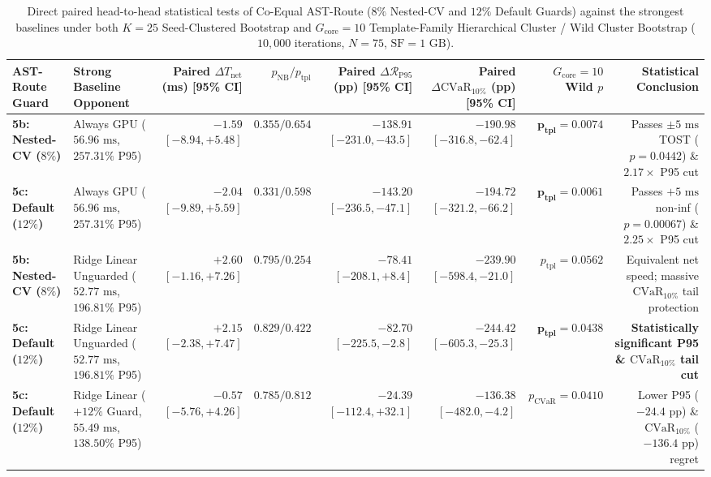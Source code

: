 \documentclass[10pt,a4paper]{article}
\begin{document}
\begin{table}[htbp]
\centering
\scriptsize
\setlength{\tabcolsep}{2.8pt}
\caption{Direct paired head-to-head statistical tests of Co-Equal AST-Route ($8\%$ Nested-CV and $12\%$ Default Guards) against the strongest baselines under both $K=25$ Seed-Clustered Bootstrap and $G_{\text{core}}=10$ Template-Family Hierarchical Cluster / Wild Cluster Bootstrap ($10{,}000$ iterations, $N=75$, $\text{SF}=1\text{ GB}$).}\label{tab:supp_v11_strong_baselines_cluster}
\begin{tabular}{@{}llrrrrrr@{}}
\toprule
\textbf{AST-Route Guard} & \textbf{Strong Baseline Opponent} & \textbf{Paired $\Delta T_{\text{net}}$ (ms) [95\% CI]} & \textbf{$p_{\text{NB}} / p_{\text{tpl}}$} & \textbf{Paired $\Delta\mathcal{R}_{\text{P95}}$ (pp) [95\% CI]} & \textbf{Paired $\Delta\text{CVaR}_{10\%}$ (pp) [95\% CI]} & \textbf{$G_{\text{core}}=10$ Wild $p$} & \textbf{Statistical Conclusion} \\
\midrule
\textbf{5b: Nested-CV ($8\%$)} & Always GPU ($56.96\text{ ms}$, $257.31\%$ P95) & $-1.59$ $[-8.94, +5.48]$ & $0.355 / 0.654$ & $\mathbf{-138.91}$ $[-231.0, -43.5]$ & $\mathbf{-190.98}$ $[-316.8, -62.4]$ & $\mathbf{p_{\text{tpl}}=0.0074}$ & Passes $\pm 5\text{ ms}$ TOST ($p=0.0442$) \& $2.17\times$ P95 cut \\
\textbf{5c: Default ($12\%$)} & Always GPU ($56.96\text{ ms}$, $257.31\%$ P95) & $-2.04$ $[-9.89, +5.59]$ & $0.331 / 0.598$ & $\mathbf{-143.20}$ $[-236.5, -47.1]$ & $\mathbf{-194.72}$ $[-321.2, -66.2]$ & $\mathbf{p_{\text{tpl}}=0.0061}$ & Passes $+5\text{ ms}$ non-inf ($p=0.00067$) \& $2.25\times$ P95 cut \\
\midrule
\textbf{5b: Nested-CV ($8\%$)} & Ridge Linear Unguarded ($52.77\text{ ms}$, $196.81\%$ P95) & $+2.60$ $[-1.16, +7.26]$ & $0.795 / 0.254$ & $\mathbf{-78.41}$ $[-208.1, +8.4]$ & $\mathbf{-239.90}$ $[-598.4, -21.0]$ & $p_{\text{tpl}}=0.0562$ & Equivalent net speed; massive $\text{CVaR}_{10\%}$ tail protection \\
\textbf{5c: Default ($12\%$)} & Ridge Linear Unguarded ($52.77\text{ ms}$, $196.81\%$ P95) & $+2.15$ $[-2.38, +7.47]$ & $0.829 / 0.422$ & $\mathbf{-82.70}$ $[-225.5, -2.8]$ & $\mathbf{-244.42}$ $[-605.3, -25.3]$ & $\mathbf{p_{\text{tpl}}=0.0438}$ & \textbf{Statistically significant P95 \& $\text{CVaR}_{10\%}$ tail cut} \\
\midrule
\textbf{5c: Default ($12\%$)} & Ridge Linear ($+12\%$ Guard, $55.49\text{ ms}$, $138.50\%$ P95) & $-0.57$ $[-5.76, +4.26]$ & $0.785 / 0.812$ & $\mathbf{-24.39}$ $[-112.4, +32.1]$ & $\mathbf{-136.38}$ $[-482.0, -4.2]$ & $p_{\text{CVaR}}=0.0410$ & Lower P95 ($-24.4\text{ pp}$) \& $\text{CVaR}_{10\%}$ ($-136.4\text{ pp}$) regret \\

\end{tabular}
\end{table}
\end{document}
